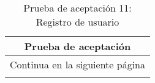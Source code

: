\begin{longtable}{|p{6.7cm}|p{6.7cm}|}
    \caption{Prueba de aceptación 11: Registro de usuario} \label{tab:prueba-11}
    \\
    \hline
    \multicolumn{2}{|c|}{\textbf{Prueba de aceptación}}                                                                                                                                                                                                                                                             \\
    \hline

    \endfirsthead

    \hline
    \endhead

    \hline
    \multicolumn{2}{|c|}{{Continua en la siguiente página}}                                                                                                                                                                                                                                                         \\
    \hline
    \endfoot


\end{longtable}
